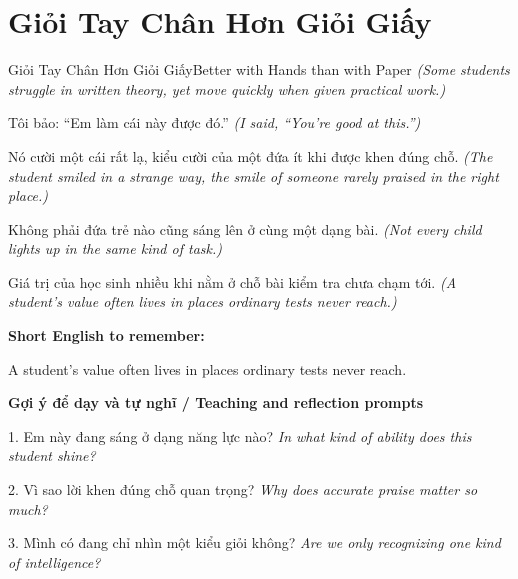 \section{Giỏi Tay Chân Hơn Giỏi Giấy}
\begin{truyen}{Giỏi Tay Chân Hơn Giỏi Giấy}{Better with Hands than with Paper}
\textit{(Some students struggle in written theory, yet move quickly when given practical work.)}

Tôi bảo: “Em làm cái này được đó.”
\textit{(I said, “You’re good at this.”)}

Nó cười một cái rất lạ, kiểu cười của một đứa ít khi được khen đúng chỗ.
\textit{(The student smiled in a strange way, the smile of someone rarely praised in the right place.)}

Không phải đứa trẻ nào cũng sáng lên ở cùng một dạng bài.
\textit{(Not every child lights up in the same kind of task.)}

\end{truyen}

\begin{baihoc}
Giá trị của học sinh nhiều khi nằm ở chỗ bài kiểm tra chưa chạm tới.
\textit{(A student’s value often lives in places ordinary tests never reach.)}
\end{baihoc}

\begin{ghinhoanh}
\textbf{Short English to remember:}

A student’s value often lives in places ordinary tests never reach.

\end{ghinhoanh}

\begin{tuhocnhanh}
\textbf{Gợi ý để dạy và tự nghĩ / Teaching and reflection prompts}

1. Em này đang sáng ở dạng năng lực nào? \textit{In what kind of ability does this student shine?}

2. Vì sao lời khen đúng chỗ quan trọng? \textit{Why does accurate praise matter so much?}

3. Mình có đang chỉ nhìn một kiểu giỏi không? \textit{Are we only recognizing one kind of intelligence?}
\end{tuhocnhanh}
\ngancach

